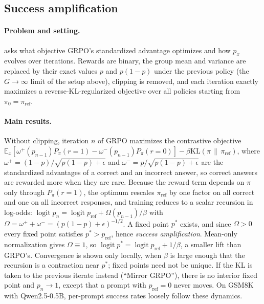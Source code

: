\documentclass{article}
\theoremstyle{definition}
\newcommand{\E}{\mathbb{E}}
\newcommand{\1}{\mathbf{1}}
\newcommand{\KL}{\mathrm{KL}}
\newcommand{\pref}{p_{\mathrm{ref}}}
\newcommand{\piref}{\pi_{\mathrm{ref}}}
\DeclareMathOperator{\logit}{logit}
\begin{document}
\subsection{\texorpdfstring{Success amplification~\citep{mroueh2025rlvr}}{Success amplification (Mroueh)}}
\label{sec:mroueh}

\paragraph{Problem and setting.}
\citet{mroueh2025rlvr} asks what objective GRPO's standardized advantage
optimizes and how $p_x$ evolves over iterations. Rewards are binary, the
group mean and variance are replaced by their exact values $p$ and
$p(1-p)$ under the previous policy (the $G\to\infty$ limit of the setup above), clipping is
removed, and each iteration exactly maximizes a reverse-KL-regularized
objective over all policies starting from
$\pi_0=\piref$.

\paragraph{Main results.}
Without clipping, iteration $n$ of GRPO maximizes the contrastive objective
$\E_x[\omega^+(p_{n-1})P_\pi(r{=}1)-\omega^-(p_{n-1})P_\pi(r{=}0)]-\beta\KL(\pi\,\|\,\piref)$,
where $\omega^+=(1-p)/\sqrt{p(1-p)+\epsilon}$ and
$\omega^-=p/\sqrt{p(1-p)+\epsilon}$ are the standardized advantages of a
correct and an incorrect answer, so correct answers are rewarded more
when they are rare. Because the reward term depends on $\pi$ only through
$P_\pi(r{=}1)$, the optimum rescales $\piref$ by one factor on all
correct and one on all incorrect responses, and training reduces to a
scalar recursion in log-odds:
$\logit p_n=\logit\pref+\Omega(p_{n-1})/\beta$ with
$\Omega=\omega^++\omega^-=(p(1-p)+\epsilon)^{-1/2}$. A fixed point $p^\ast$
exists, and since $\Omega>0$ every fixed point satisfies $p^\ast>\pref$,
hence \emph{success amplification}. Mean-only normalization gives
$\Omega\equiv1$, so $\logit p^\ast=\logit\pref+1/\beta$, a smaller lift
than GRPO's. Convergence is shown only locally, when
$\beta$ is large enough that the recursion is a contraction near $p^\ast$;
fixed points need not be unique. If the KL is taken to the previous
iterate instead (``Mirror GRPO''), there is no interior fixed point and
$p_n\to1$, except that a prompt with $\pref=0$ never moves. On GSM8K with
Qwen2.5-0.5B, per-prompt success rates loosely follow these dynamics.
\end{document}
